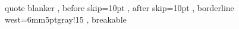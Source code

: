 \makeatletter
\g@addto@macro\bfseries{\boldmath}
\makeatother

\makeatletter
\def\defthm#1#2{%
	\newtheorem{#1}{#2}[section]%
	\expandafter\def\csname #1autorefname\endcsname{#2}%
	\expandafter\let\csname c@#1\endcsname\c@theorem}
\makeatother

\tcolorboxenvironment%
{quote}{ blanker
	, before skip=10pt
	, after skip=10pt
	, borderline west={6mm}{5pt}{gray!15}
	, breakable
}

\setcounter{tocdepth}{1}
